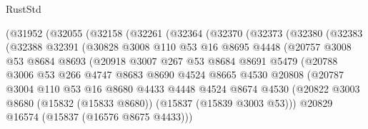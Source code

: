 \begin{lexlean}{RustStd}
\begin{coremodule}
{\begin{coremodule}
{{{{{{{{{{{{{{{{{{{{{{{{{{{{{{{{{{{{{{{{{{{{{{{{{{{{{{{{{{{{            (@31952
              (@32055
                (@32158
                  (@32261
                    (@32364
                      (@32370
                        (@32373
                          (@32380
                            (@32383
                              (@32388
                                @32391
                                (@30828
                                  @3008
                                  @110
                                  @53
                                  @16
                                  @8695
                                  @4448
                                  (@20757
                                    @3008
                                    @53
                                    @8684
                                    @8693
                                    (@20918
                                      @3007
                                      @267
                                      @53
                                      @8684
                                      @8691
                                      @5479
                                      (@20788
                                        @3006
                                        @53
                                        @266
                                        @4747
                                        @8683
                                        @8690
                                        @4524
                                        @8665
                                        @4530
                                        @20808
                                        (@20787
                                          @3004
                                          @110
                                          @53
                                          @16
                                          @8680
                                          @4433
                                          @4448
                                          @4524
                                          @8674
                                          @4530
                                          (@20822
                                            @3003
                                            @8680
                                            (@15832 (@15833 @8680))
                                            (@15837 (@15839 @3003 @53)))
                                          @20829
                                          @16574
                                          (@15837 (@16576 @8675 @4433)))
}}}}}}}}}}}}}}}}}}}}}}}}}}}}}}}}}}}}}}}}}}}}}}}}}}}}}}}}}}}}
\end{coremodule}}
\end{coremodule}
\end{lexlean}
